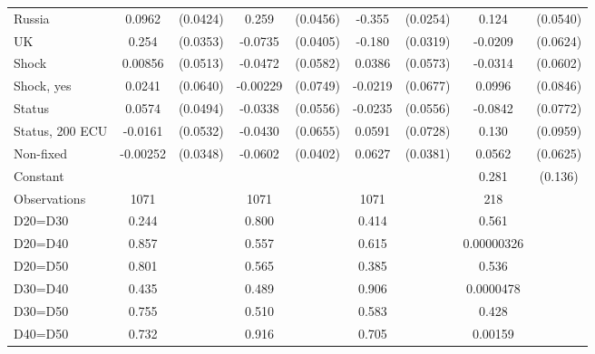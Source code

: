 \begin{tabular}{l|cccccc|cc}
Russia        &   0.0962\sym{**} & (0.0424)&    0.259\sym{***}& (0.0456)&   -0.355\sym{***}& (0.0254)&    0.124\sym{**} & (0.0540)\\
UK            &    0.254\sym{***}& (0.0353)&  -0.0735\sym{*}  & (0.0405)&   -0.180\sym{***}& (0.0319)&  -0.0209         & (0.0624)\\
Shock         &  0.00856         & (0.0513)&  -0.0472         & (0.0582)&   0.0386         & (0.0573)&  -0.0314         & (0.0602)\\
Shock, yes    &   0.0241         & (0.0640)& -0.00229         & (0.0749)&  -0.0219         & (0.0677)&   0.0996         & (0.0846)\\
Status        &   0.0574         & (0.0494)&  -0.0338         & (0.0556)&  -0.0235         & (0.0556)&  -0.0842         & (0.0772)\\
Status, 200 ECU&  -0.0161         & (0.0532)&  -0.0430         & (0.0655)&   0.0591         & (0.0728)&    0.130         & (0.0959)\\
Non-fixed     & -0.00252         & (0.0348)&  -0.0602         & (0.0402)&   0.0627\sym{*}  & (0.0381)&   0.0562         & (0.0625)\\
Constant        &                  &         &                  &         &                  &         &    0.281\sym{**} &  (0.136)\\
\hline
Observations    &     1071         &         &     1071         &         &     1071         &         &      218         &         \\
D20=D30         &    0.244         &         &    0.800         &         &    0.414         &         &    0.561         &         \\
D20=D40         &    0.857         &         &    0.557         &         &    0.615         &         &0.00000326         &         \\
D20=D50         &    0.801         &         &    0.565         &         &    0.385         &         &    0.536         &         \\
D30=D40         &    0.435         &         &    0.489         &         &    0.906         &         &0.0000478         &         \\
D30=D50         &    0.755         &         &    0.510         &         &    0.583         &         &    0.428         &         \\
D40=D50         &    0.732         &         &    0.916         &         &    0.705         &         &  0.00159         &         \\

\end{tabular}
